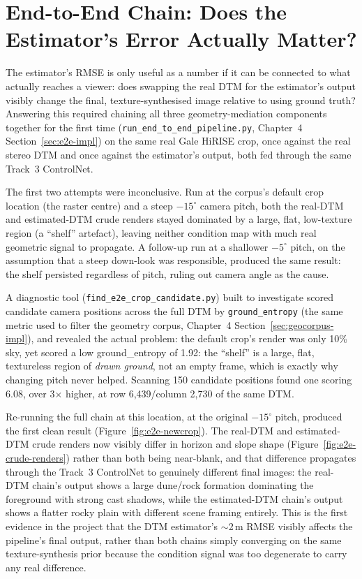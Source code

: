 \section{End-to-End Chain: Does the Estimator's Error Actually Matter?}
\label{sec:e2e-results}

The estimator's RMSE is only useful as a number if it can be connected to what actually reaches a viewer: does swapping the real DTM for the estimator's output visibly change the final, texture-synthesised image relative to using ground truth? Answering this required chaining all three geometry-mediation components together for the first time (\texttt{run\_end\_to\_end\_pipeline.py}, Chapter~4 Section~\ref{sec:e2e-impl}) on the same real Gale HiRISE crop, once against the real stereo DTM and once against the estimator's output, both fed through the same Track~3 ControlNet.

The first two attempts were inconclusive. Run at the corpus's default crop location (the raster centre) and a steep $-15^{\circ}$ camera pitch, both the real-DTM and estimated-DTM crude renders stayed dominated by a large, flat, low-texture region (a ``shelf'' artefact), leaving neither condition map with much real geometric signal to propagate. A follow-up run at a shallower $-5^{\circ}$ pitch, on the assumption that a steep down-look was responsible, produced the same result: the shelf persisted regardless of pitch, ruling out camera angle as the cause.

A diagnostic tool (\texttt{find\_e2e\_crop\_candidate.py}) built to investigate scored candidate camera positions across the full DTM by \texttt{ground\_entropy} (the same metric used to filter the geometry corpus, Chapter~4 Section~\ref{sec:geocorpus-impl}), and revealed the actual problem: the default crop's render was only 10\% sky, yet scored a low ground\_entropy of 1.92: the ``shelf'' is a large, flat, textureless region of \emph{drawn ground}, not an empty frame, which is exactly why changing pitch never helped. Scanning 150 candidate positions found one scoring 6.08, over 3$\times$ higher, at row 6{,}439/column 2{,}730 of the same DTM.

Re-running the full chain at this location, at the original $-15^{\circ}$ pitch, produced the first clean result (Figure~\ref{fig:e2e-newcrop}). The real-DTM and estimated-DTM crude renders now visibly differ in horizon and slope shape (Figure~\ref{fig:e2e-crude-renders}) rather than both being near-blank, and that difference propagates through the Track~3 ControlNet to genuinely different final images: the real-DTM chain's output shows a large dune/rock formation dominating the foreground with strong cast shadows, while the estimated-DTM chain's output shows a flatter rocky plain with different scene framing entirely. This is the first evidence in the project that the DTM estimator's $\sim$2\,m RMSE visibly affects the pipeline's final output, rather than both chains simply converging on the same texture-synthesis prior because the condition signal was too degenerate to carry any real difference.

